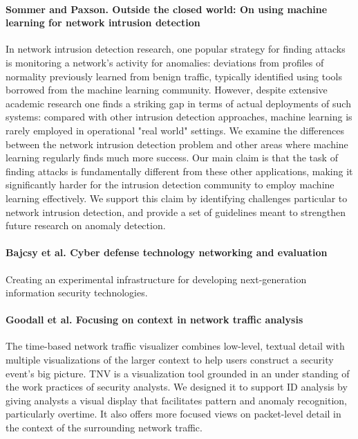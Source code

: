 \paragraph*{Sommer and Paxson. Outside the closed world: On using machine learning for network intrusion detection}
\cite{sommer2010outside}
In network intrusion detection research, one popular strategy for finding attacks is monitoring a network's activity for anomalies: deviations from profiles of normality previously learned from benign traffic, typically identified using tools borrowed from the machine learning community. However, despite extensive academic research one finds a striking gap in terms of actual deployments of such systems: compared with other intrusion detection approaches, machine learning is rarely employed in operational "real world" settings. We examine the differences between the network intrusion detection problem and other areas where machine learning regularly finds much more success. Our main claim is that the task of finding attacks is fundamentally different from these other applications, making it significantly harder for the intrusion detection community to employ machine learning effectively. We support this claim by identifying challenges particular to network intrusion detection, and provide a set of guidelines meant to strengthen future research on anomaly detection.

\paragraph*{Bajcsy et al. Cyber defense technology networking and evaluation}
\cite{bajcsy2004cyber}
Creating an experimental infrastructure for developing next-generation information security technologies.

\paragraph*{Goodall et al. Focusing on context in network traffic analysis}
\cite{goodall2006focusing}
The time-based network traffic visualizer combines low-level, textual detail with multiple visualizations of the larger context to help users construct a security event's big picture. TNV is a visualization tool grounded in an under standing of the work practices of security analysts. We designed it to support ID analysis by giving analysts a visual display that facilitates pattern and anomaly recognition, particularly overtime. It also offers more focused views on packet-level detail in the context of the surrounding network traffic.


